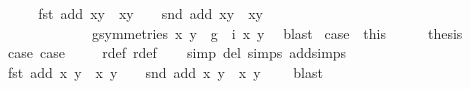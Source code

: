 \begin{isabellebody}
\ \ \isamarkupfalse%
\ \isamarkupfalse%
\ {\isachardoublequoteopen}fst\ {\isacharparenleft}add\ {\isacharparenleft}x{\isacharcomma}y{\isacharparenright}\ {\isacharparenleft}{\isasymtau}\ {\isacharparenleft}x{\isacharprime}{\isacharcomma}y{\isacharprime}{\isacharparenright}{\isacharparenright}{\isacharparenright}\ {\isacharequal}\ {}\ {\isasymor}\ snd\ {\isacharparenleft}add\ {\isacharparenleft}x{\isacharcomma}y{\isacharparenright}\ {\isacharparenleft}{\isasymtau}\ {\isacharparenleft}x{\isacharprime}{\isacharcomma}y{\isacharprime}{\isacharparenright}{\isacharparenright}{\isacharparenright}\ {\isacharequal}\ {}\ {\isasymLongrightarrow}\isanewline
\ \ \ \ \ \ \ \ \ \ \ \ \ {\isacharparenleft}{\isasymexists}g{\isasymin}symmetries{\isachardot}\ {\isacharparenleft}x{\isacharprime}{\isacharcomma}\ y{\isacharprime}{\isacharparenright}\ {\isacharequal}\ {\isacharparenleft}g\ {\isasymcirc}\ i{\isacharparenright}\ {\isacharparenleft}x{\isacharcomma}\ y{\isacharparenright}{\isacharparenright}{\isachardoublequoteclose}\ \isamarkupfalse%
\ blast\isanewline
{}\isamarkupfalse%
\ case{}\ {\isacharequal}\ this\ \isanewline
\ \isanewline
{}\isamarkupfalse%
\ \isamarkupfalse%
\ {\isacharquery}thesis\ \isanewline
\ \ \isamarkupfalse%
\ case{}\ case{}\ \isanewline
\ \ \isamarkupfalse%
\ r{}{\isacharunderscore}def\ r{}{\isacharunderscore}def\ \isanewline
\ \ \isamarkupfalse%
{\isacharparenleft}simp\ del{\isacharcolon}\ {\isasymtau}{\isachardot}simps\ add{\isachardot}simps{\isacharparenright}\ \isanewline
\ \ \isamarkupfalse%
\ {\isacartoucheopen}fst\ {\isacharparenleft}add\ {\isacharparenleft}x{\isacharcomma}\ y{\isacharparenright}\ {\isacharparenleft}{\isasymtau}\ {\isacharparenleft}x{\isacharprime}{\isacharcomma}\ y{\isacharprime}{\isacharparenright}{\isacharparenright}{\isacharparenright}\ {\isacharequal}\ {}\ {\isasymor}\ snd\ {\isacharparenleft}add\ {\isacharparenleft}x{\isacharcomma}\ y{\isacharparenright}\ {\isacharparenleft}{\isasymtau}\ {\isacharparenleft}x{\isacharprime}{\isacharcomma}\ y{\isacharprime}{\isacharparenright}{\isacharparenright}{\isacharparenright}\ {\isacharequal}\ {}{\isacartoucheclose}\ \isamarkupfalse%
\ blast\ \ \ \ \ \ \ \ \ \ \ \ \ \ \isanewline
{}\isamarkupfalse%
%
\endisatagproof
{\isafoldproof}%
%
\isadelimproof
\isanewline
%
\endisadelimproof

\end{isabellebody}
